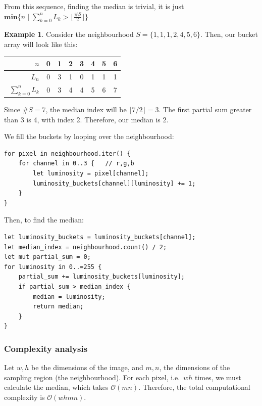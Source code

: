 \documentclass[12pt]{article}
\theoremstyle{definition}
\newtheorem*{example}{Example}
\begin{document}
From this sequence, finding the median is trivial, it is just $\mathbf{min}\big\{n \mid \sum_{k=0}^n L_k > \lfloor \frac{\#S}{2} \rfloor \big\}$

\begin{example}
Consider the neighbourhood $S = \{1,1,1,2,4,5,6\}$.
Then, our bucket array will look like this:
\begin{table}[H]\centering
    \begin{tabular}{|r|c|c|c|c|c|c|c|}
        \hline
        $\phantom{\big|}n$                & 0 & 1 & 2 & 3 & 4 & 5 & 6 \\ \hline
        $\phantom{\big|}L_n$              & 0 & 3 & 1 & 0 & 1 & 1 & 1 \\ \hline\hline
        $\phantom{\Big|}\sum_{k=0}^n L_k$ & 0 & 3 & 4 & 4 & 5 & 6 & 7 \\
        \hline
    \end{tabular}
\end{table}
Since $\#S = 7$, the median index will be $\lfloor 7/2 \rfloor = 3$.
The first partial sum greater than 3 is 4, with index 2. Therefore, our median is 2.
\end{example}

We fill the buckets by looping over the neighbourhood:
\begin{lstlisting}
for pixel in neighbourhood.iter() {
    for channel in 0..3 {   // r,g,b
        let luminosity = pixel[channel];
        luminosity_buckets[channel][luminosity] += 1;
    }
}
\end{lstlisting}

Then, to find the median: 
\begin{lstlisting}
let luminosity_buckets = luminosity_buckets[channel];
let median_index = neighbourhood.count() / 2;
let mut partial_sum = 0;
for luminosity in 0..=255 {
    partial_sum += luminosity_buckets[luminosity];
    if partial_sum > median_index {
        median = luminosity;
        return median;
    }
}

\end{lstlisting}


\subsubsection{Complexity analysis}

Let $w,h$ be the dimensions of the image, and $m,n$, the dimensions of the sampling region (the neighbourhood).
For each pixel, i.e.\ $wh$ times, we must calculate the median, which takes $\mathcal{O}(mn)$.
Therefore, the total computational complexity is $\mathcal{O}(whmn)$.
\end{document}
